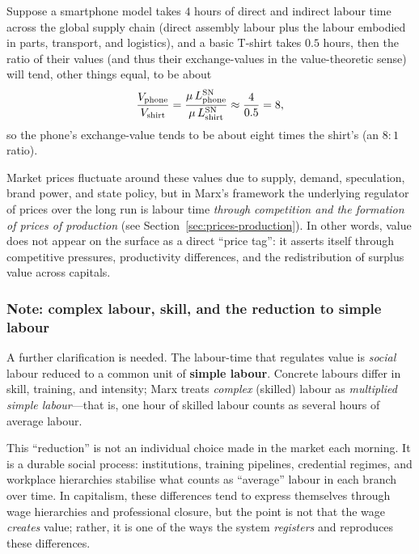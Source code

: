 Suppose a smartphone model takes $4$ hours of direct and indirect labour
time across the global supply chain (direct assembly labour plus the labour embodied in
parts, transport, and logistics), and a basic T-shirt takes $0.5$ hours, then the ratio
of their values (and thus their exchange-values in the value-theoretic sense) will tend,
other things equal, to be about
\[
  \frac{V_{\text{phone}}}{V_{\text{shirt}}}
  = \frac{\mu\,L^{\mathrm{SN}}_{\text{phone}}}{\mu\,L^{\mathrm{SN}}_{\text{shirt}}}
  \approx \frac{4}{0.5} = 8,
\]
so the phone’s exchange-value tends to be about eight times the shirt’s (an $8{:}1$ ratio).

Market prices fluctuate around these values due to supply, demand, speculation, brand
power, and state policy, but in Marx's framework the underlying regulator of prices over
the long run is labour time \emph{through competition and the formation of prices of production} (see Section~\ref{sec:prices-production}).
In other words, value does not appear on the surface as a direct ``price tag'': it asserts itself
through competitive pressures, productivity differences, and the redistribution of surplus value
across capitals.

\subsubsection{Note: complex labour, skill, and the reduction to simple labour}
\label{sec:complex-labour-note}

A further clarification is needed. The labour-time that regulates value is \emph{social}
labour reduced to a common unit of \textbf{simple labour}. Concrete labours differ in
skill, training, and intensity; Marx treats \emph{complex} (skilled) labour as
\emph{multiplied simple labour}---that is, one hour of skilled labour counts as several
hours of average labour.\cite{Marx1867}

This ``reduction'' is not an individual choice made in the market each morning. It is a
durable social process: institutions, training pipelines, credential regimes, and workplace
hierarchies stabilise what counts as ``average'' labour in each branch over time. In capitalism,
these differences tend to express themselves through wage hierarchies and professional closure,
but the point is not that the wage \emph{creates} value; rather, it is one of the ways the system
\emph{registers} and reproduces these differences.\cite{Foley1986,Shaikh2016}

